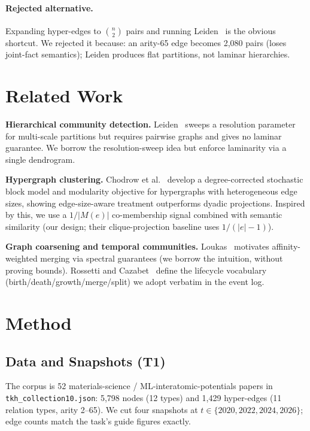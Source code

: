 \documentclass[10pt]{article}
\begin{document}
\paragraph{Rejected alternative.}
Expanding hyper-edges to $\binom{n}{2}$ pairs and running Leiden~\cite{traag2019leiden}
is the obvious shortcut.
We rejected it because: an arity-65 edge becomes 2,080 pairs (loses joint-fact
semantics); Leiden produces flat partitions, not laminar hierarchies.

\section{Related Work}\label{sec:related}

\textbf{Hierarchical community detection.}
Leiden~\cite{traag2019leiden} sweeps a resolution parameter for multi-scale
partitions but requires pairwise graphs and gives no laminar guarantee.
We borrow the resolution-sweep idea but enforce laminarity via a single dendrogram.

\textbf{Hypergraph clustering.}
Chodrow et al.~\cite{chodrow2021hypergraph} develop a degree-corrected stochastic
block model and modularity objective for hypergraphs with heterogeneous edge sizes,
showing edge-size-aware treatment outperforms dyadic projections.
Inspired by this, we use a $1/|M(e)|$ co-membership signal combined with semantic
similarity (our design; their clique-projection baseline uses $1/(|e|-1)$).

\textbf{Graph coarsening and temporal communities.}
Loukas~\cite{loukas2019coarsening} motivates affinity-weighted merging via spectral
guarantees (we borrow the intuition, without proving bounds).
Rossetti and Cazabet~\cite{rossetti2018dynamic} define the lifecycle vocabulary
(birth/death/growth/merge/split) we adopt verbatim in the event log.

\section{Method}\label{sec:method}

\subsection{Data and Snapshots (T1)}\label{sec:t1}

The corpus is 52 materials-science / ML-interatomic-potentials papers in
\texttt{tkh\_collection10.json}: 5,798 nodes (12 types) and 1,429 hyper-edges
(11 relation types, arity 2–65).
We cut four snapshots at $t \in \{2020,2022,2024,2026\}$; edge counts match the
task's guide figures exactly.
\end{document}
